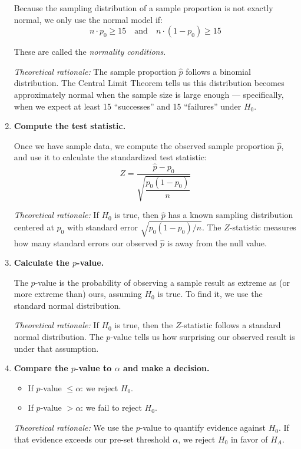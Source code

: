 \documentclass[11pt]{article}
\begin{document}
\begin{enumerate}[label=\textbf{Step \arabic*:}, leftmargin=2.5em]
Because the sampling distribution of a sample proportion is not exactly normal, we only use the normal model if:
\[
n \cdot p_0 \geq 15 \quad \text{and} \quad n \cdot (1 - p_0) \geq 15
\]

These are called the \textit{normality conditions}.

\textit{Theoretical rationale:} The sample proportion $\hat{p}$ follows a binomial distribution. The Central Limit Theorem tells us this distribution becomes approximately normal when the sample size is large enough — specifically, when we expect at least 15 ``successes'' and 15 ``failures'' under $H_0$.

\vspace{0.5em}
\item \textbf{Compute the test statistic.}

Once we have sample data, we compute the observed sample proportion $\hat{p}$, and use it to calculate the standardized test statistic:
\[
Z = \frac{\hat{p} - p_0}{\sqrt{ \dfrac{p_0(1 - p_0)}{n} }}
\]

\textit{Theoretical rationale:} If $H_0$ is true, then $\hat{p}$ has a known sampling distribution centered at $p_0$ with standard error $\sqrt{p_0(1 - p_0)/n}$. The $Z$-statistic measures how many standard errors our observed $\hat{p}$ is away from the null value.

\vspace{0.5em}
\item \textbf{Calculate the $p$-value.}

The $p$-value is the probability of observing a sample result as extreme as (or more extreme than) ours, assuming $H_0$ is true. To find it, we use the standard normal distribution.

\textit{Theoretical rationale:} If $H_0$ is true, then the $Z$-statistic follows a standard normal distribution. The $p$-value tells us how surprising our observed result is under that assumption.

\vspace{0.5em}
\item \textbf{Compare the $p$-value to $\alpha$ and make a decision.}

\begin{itemize}
  \item If $p$-value $\leq \alpha$: we reject $H_0$.
  \item If $p$-value $> \alpha$: we fail to reject $H_0$.
\end{itemize}

\textit{Theoretical rationale:} We use the $p$-value to quantify evidence against $H_0$. If that evidence exceeds our pre-set threshold $\alpha$, we reject $H_0$ in favor of $H_A$.


\end{enumerate}
\end{document}
